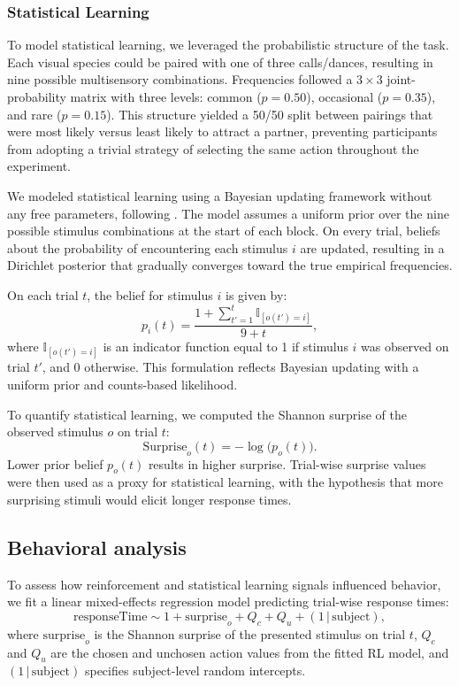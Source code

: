 \documentclass{article}
\begin{document}
\subsubsection*{Statistical Learning}

To model statistical learning, we leveraged the probabilistic structure of the task. Each visual species could be paired with one of three calls/dances, resulting in nine possible multisensory combinations. Frequencies followed a $3 \times 3$ joint-probability matrix with three levels: common ($p=0.50$), occasional ($p=0.35$), and rare ($p=0.15$). This structure yielded a 50/50 split between pairings that were most likely versus least likely to attract a partner, preventing participants from adopting a trivial strategy of selecting the same action throughout the experiment.

We modeled statistical learning using a Bayesian updating framework without any free parameters, following \cite{konovalov2016gaze}. The model assumes a uniform prior over the nine possible stimulus combinations at the start of each block. On every trial, beliefs about the probability of encountering each stimulus $i$ are updated, resulting in a Dirichlet posterior that gradually converges toward the true empirical frequencies.

On each trial $t$, the belief for stimulus $i$ is given by:
\[
p_i(t) = \frac{1 + \sum_{t'=1}^{t} \mathbb{I}_{[o(t') = i]}}{9 + t},
\]
where $\mathbb{I}_{[o(t') = i]}$ is an indicator function equal to 1 if stimulus $i$ was observed on trial $t'$, and 0 otherwise. This formulation reflects Bayesian updating with a uniform prior and counts-based likelihood.

To quantify statistical learning, we computed the Shannon surprise of the observed stimulus $o$ on trial $t$:
\[
\text{Surprise}_o(t) = -\log\big(p_o(t)\big).
\]
Lower prior belief $p_o(t)$ results in higher surprise. Trial-wise surprise values were then used as a proxy for statistical learning, with the hypothesis that more surprising stimuli would elicit longer response times.

\subsection*{Behavioral analysis}

To assess how reinforcement and statistical learning signals influenced behavior, we fit a linear mixed-effects regression model predicting trial-wise response times: 
\[
\text{responseTime} \sim 1 + \text{surprise}_o + Q_c + Q_u + (1 \,|\, \text{subject}),
\]  
where $\text{surprise}_o$ is the Shannon surprise of the presented stimulus on trial $t$, $Q_c$ and $Q_u$ are the chosen and unchosen action values from the fitted RL model, and $(1 \,|\, \text{subject})$ specifies subject-level random intercepts. 
\end{document}
